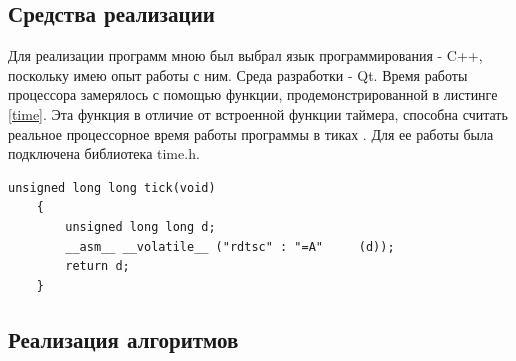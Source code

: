 \documentclass[a4paper, 14pt]{article}
\begin{document}
	\subsection{Средства реализации}
	\hspace{1cm}Для реализации программ мною был выбрал язык программирования - C++, поскольку имею опыт работы с ним. 
	Среда разработки - Qt.
	Время работы процессора замерялось с помощью функции, продемонстрированной в листинге \ref{time}. Эта функция в отличие от встроенной функции таймера, способна считать реальное процессорное время работы программы в тиках \cite{lom}. Для ее работы была подключена библиотека time.h.
	\begin{lstlisting}[label=time,caption=Функция замера процессороного времени]
    unsigned long long tick(void)
    {
        unsigned long long d;
        __asm__ __volatile__ ("rdtsc" : "=A"     (d));
        return d;
    }
	\end{lstlisting}

	\newpage
	\subsection{Реализация алгоритмов}
	
\end{document}
